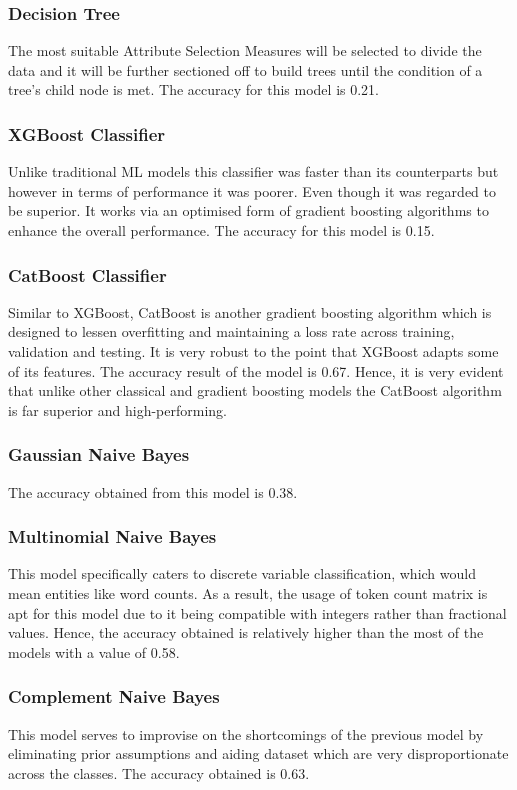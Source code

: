 \documentclass[11pt,a4paper]{article}
\begin{document}
	\subsubsection{Decision Tree}
	The most suitable Attribute Selection Measures will be selected to divide the data and it will be further sectioned off to build trees until the condition of a tree’s child node is met. The accuracy for this model is 0.21.
	\subsubsection{XGBoost Classifier}
	Unlike traditional ML models this classifier was faster than its counterparts but however in terms of performance it was poorer. Even though it was regarded to be superior. It works via an optimised form of gradient boosting algorithms to enhance the overall performance. The accuracy for this model is 0.15.
	\subsubsection{CatBoost Classifier}
	Similar to XGBoost, CatBoost is another gradient boosting algorithm which is designed to lessen overfitting and maintaining a loss rate across training, validation and testing. It is very robust to the point that XGBoost adapts some of its features. The accuracy result of the model is 0.67. Hence, it is very evident that unlike other classical and gradient boosting models the CatBoost algorithm is far superior and high-performing.
	\subsubsection{Gaussian Naive Bayes}
	The accuracy obtained from this model is 0.38.
	\subsubsection{Multinomial Naive Bayes}
	This model specifically caters to discrete variable classification, which would mean entities like word counts. As a result, the usage of token count matrix is apt for this model due to it being compatible with integers rather than fractional values. Hence, the accuracy obtained is relatively higher than the most of the models with a value of 0.58.
	\subsubsection{Complement Naive Bayes}
	This model serves to improvise on the shortcomings of the previous model by eliminating prior assumptions and aiding dataset which are very disproportionate across the classes. The accuracy obtained is 0.63.
\end{document}
